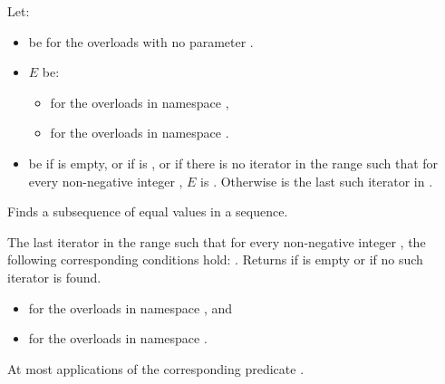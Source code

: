 \begin{itemdescr}
\begin{addedblock}
\pnum
Let:
\begin{itemize}
\item {} be  for the overloads with no parameter
.

\item $E$ be:
\begin{itemize}
\item {}
for the overloads in namespace ,

\item {}
for the overloads in namespace .
\end{itemize}

\item {} be  if  is empty,
or if  is ,
or if there is no iterator
in the range 
such that for every non-negative integer
, $E$ is .
Otherwise  is the last such iterator
in .
\end{itemize}
\end{addedblock}

\pnum
\effects
Finds a subsequence of equal values in a sequence.

\begin{removedblock}
\pnum
\returns
The last iterator
in the range 
such that for every non-negative integer
,
the following corresponding conditions hold:
.
Returns 
if
 is empty or if
no such iterator is found.
\end{removedblock}

\begin{addedblock}
\pnum
\returns
\begin{itemize}
\item {} for the overloads in namespace , and
\item {}
  for the overloads in namespace .
\end{itemize}
\end{addedblock}

\pnum
\complexity
At most
applications of the corresponding predicate .
\end{itemdescr}

